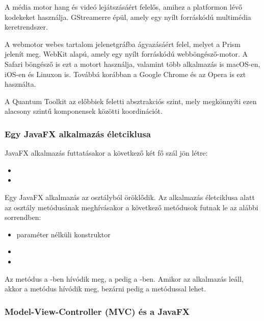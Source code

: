 A média motor hang és videó lejátszásáért felelős, amihez a platformon lévő kodekeket használja.
GStreamerre épül, amely egy nyílt forráskódú multimédia keretrendszer.

A webmotor webes tartalom jelenetgráfba ágyazásáért felel, melyet a Prism jelenít meg.
WebKit alapú, amely egy nyílt forráskódú webböngésző-motor.
A Safari böngésző is ezt a motort használja, valamint több alkalmazás is macOS-en, iOS-en és Linuxon is.
Továbbá korábban a Google Chrome és az Opera is ezt használta.

A Quantum Toolkit az előbbiek feletti absztrakciós szint, mely megkönnyíti ezen alacsony szintű komponensek közötti koordinációt.


\subsubsection*{Egy JavaFX alkalmazás életciklusa}

JavaFX alkalmazás futtatásakor a következő két fő szál jön létre: 

\begin{itemize}
\item {}
\item {}
\end{itemize}

Egy JavaFX alkalmazás az  osztályból öröklődik.
Az alkalmazás életciklusa alatt az  osztály  metódusának meghívásakor a következő metódusok futnak le az alábbi sorrendben: 

\begin{itemize}
\item paraméter nélküli konstruktor 
\item {}
\item {}
\end{itemize}

Az  metódus a -ben hívódik meg, a  pedig a -ben.\cite{javafx3}
Amikor az alkalmazás leáll, akkor a  metódus hívódik meg, bezárni pedig a  metódussal lehet.  

\subsubsection*{Model-View-Controller (MVC) és a JavaFX}

